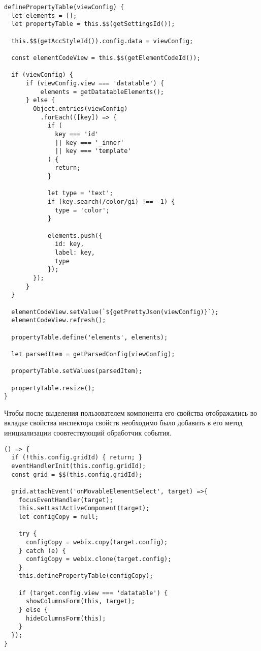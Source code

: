\begin{lstlisting}
definePropertyTable(viewConfig) {
  let elements = [];
  let propertyTable = this.$$(getSettingsId());

  this.$$(getAccStyleId()).config.data = viewConfig;

  const elementCodeView = this.$$(getElementCodeId());

  if (viewConfig) {
      if (viewConfig.view === 'datatable') {
          elements = getDatatableElements();
      } else {
        Object.entries(viewConfig)
          .forEach(([key]) => {
            if (
              key === 'id'
              || key === '_inner'
              || key === 'template'
            ) {
              return;
            }

            let type = 'text';
            if (key.search(/color/gi) !== -1) {
              type = 'color';
            }

            elements.push({
              id: key,
              label: key,
              type
            });
        });
      }
  }

  elementCodeView.setValue(`${getPrettyJson(viewConfig)}`);
  elementCodeView.refresh();

  propertyTable.define('elements', elements);

  let parsedItem = getParsedConfig(viewConfig);

  propertyTable.setValues(parsedItem);

  propertyTable.resize();
}
\end{lstlisting}

Чтобы после выделения пользователем компонента его свойства отображались во вкладке свойства инспектора свойств необходимо было добавить в его метод инициализации соовтествующий обработчик события.

\begin{lstlisting}
() => {
  if (!this.config.gridId) { return; }
  eventHandlerInit(this.config.gridId);
  const grid = $$(this.config.gridId);

  grid.attachEvent('onMovableElementSelect', target) =>{
    focusEventHandler(target);
    this.setLastActiveComponent(target);
    let configCopy = null;

    try {
      configCopy = webix.copy(target.config);
    } catch (e) {
      configCopy = webix.clone(target.config);
    }
    this.definePropertyTable(configCopy);

    if (target.config.view === 'datatable') {
      showColumnsForm(this, target);
    } else {
      hideColumnsForm(this);
    }
  });
}
\end{lstlisting}

